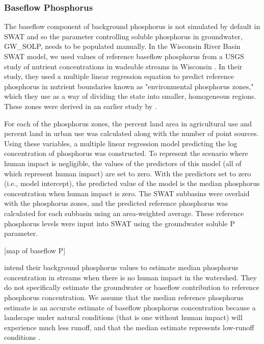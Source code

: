 \subsubsection{Baseflow Phosphorus}
	The baseflow component of background phosphorus is not simulated by default in SWAT and so the parameter controlling soluble phosphorus in groundwater, GW\_SOLP, needs to be populated manually. In the Wisconsin River Basin SWAT model, we used values of reference baseflow phosphorus from a USGS study of nutrient concentrations in wadeable streams in Wisconsin \citet{robertson_wadeable_2006}. In their study, they used a multiple linear regression equation to predict reference phosphorus in nutrient boundaries known as "environmental phosphorus zones," which they use as a way of dividing the state into smaller, homogeneous regions. These zones were derived in an earlier study by \citet{robertson_phosphoruszones_2006}.
	
	For each of the phosphorus zones, the percent land area in agricultural use and percent land in urban use was calculated along with the number of point sources. Using these variables, a multiple linear regression model predicting the log concentration of phosphorus was constructed. To represent the scenario where human impact is negligible, the values of the predictors of this model (all of which represent human impact) are set to zero. With the predictors set to zero (i.e., model intercept), the predicted value of the model is the median phosphorus concentration when human impact is zero. The SWAT subbasins were overlaid with the phosphorus zones, and the predicted reference phosphorus was calculated for each subbasin using an area-weighted average. These reference phosphorus levels were input into SWAT using the groundwater soluble P parameter.
	
	[map of baseflow P]
	
	\citet{robertson_wadeable_2006} intend their background phosphorus values to estimate median phosphorus concentration in streams when there is no human impact in the watershed. They do not specifically estimate the groundwater or baseflow contribution to reference phosphorus concentration. We assume that the median reference phosphorus estimate is an accurate estimate of baseflow phosphorus concentration because a landscape under natural conditions (that is one without human impact) will experience much less runoff, and that the median estimate represents low-runoff conditions \citep{nrcs_tr55_1986}.
	
	
	
	